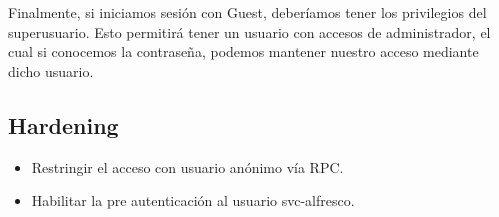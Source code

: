 \documentclass{article}
\begin{document}
Finalmente, si iniciamos sesión con Guest, deberíamos tener los privilegios del superusuario. Esto permitirá tener un usuario con accesos de administrador, el cual si conocemos la contraseña, podemos mantener nuestro acceso mediante dicho usuario.

\subsection{Hardening}

\begin{itemize}
	\item Restringir el acceso con usuario anónimo vía RPC.
	\item Habilitar la pre autenticación al usuario svc-alfresco.
\end{itemize}
\end{document}
